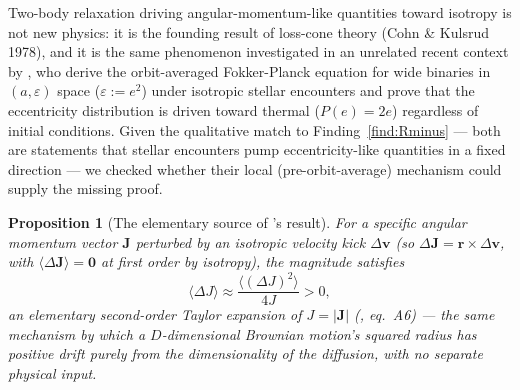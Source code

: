 \documentclass[12pt]{amsart}
\theoremstyle{plain}
\newtheorem{proposition}[theorem]{Proposition}
\theoremstyle{remark}
\begin{document}
Two-body relaxation driving angular-momentum-like quantities toward isotropy is not new physics: it is the founding result of loss-cone theory (Cohn \& Kulsrud 1978), and it is the same phenomenon investigated in an unrelated recent context by \cite{HamiltonModak2024}, who derive the orbit-averaged Fokker-Planck equation for wide binaries in $(a,\varepsilon)$ space ($\varepsilon:=e^2$) under isotropic stellar encounters and prove that the eccentricity distribution is driven toward thermal ($P(e)=2e$) regardless of initial conditions. Given the qualitative match to Finding~\ref{find:Rminus} --- both are statements that stellar encounters pump eccentricity-like quantities in a fixed direction --- we checked whether their local (pre-orbit-average) mechanism could supply the missing proof.

\begin{proposition}[The elementary source of \cite{HamiltonModak2024}'s result]\label{prop:HM}
For a specific angular momentum vector $\mathbf{J}$ perturbed by an isotropic velocity kick $\Delta\mathbf{v}$ (so $\Delta\mathbf{J}=\mathbf{r}\times\Delta\mathbf{v}$, with $\langle\Delta\mathbf{J}\rangle=\mathbf{0}$ at first order by isotropy), the magnitude satisfies
\begin{equation}
\langle\Delta J\rangle \approx \frac{\langle(\Delta J)^2\rangle}{4J} > 0, \tag{6}
\end{equation}
an elementary second-order Taylor expansion of $J=|\mathbf{J}|$ (\cite{HamiltonModak2024}, eq.~A6) --- the same mechanism by which a $D$-dimensional Brownian motion's squared radius has positive drift purely from the dimensionality of the diffusion, with no separate physical input.
\end{proposition}
\end{document}
